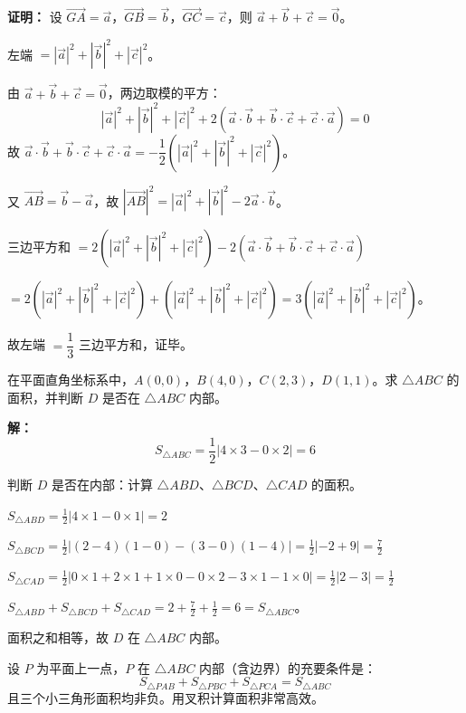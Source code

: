 \documentclass[12pt, a4paper]{ctexart}
\begin{document}
\textbf{证明：} 设 $\overrightarrow{GA}=\vec{a}$，$\overrightarrow{GB}=\vec{b}$，$\overrightarrow{GC}=\vec{c}$，则 $\vec{a}+\vec{b}+\vec{c}=\vec{0}$。

左端 $= |\vec{a}|^2 + |\vec{b}|^2 + |\vec{c}|^2$。

由 $\vec{a}+\vec{b}+\vec{c}=\vec{0}$，两边取模的平方：
\[
|\vec{a}|^2 + |\vec{b}|^2 + |\vec{c}|^2 + 2(\vec{a}\cdot\vec{b}+\vec{b}\cdot\vec{c}+\vec{c}\cdot\vec{a}) = 0
\]
故 $\vec{a}\cdot\vec{b}+\vec{b}\cdot\vec{c}+\vec{c}\cdot\vec{a} = -\dfrac{1}{2}(|\vec{a}|^2+|\vec{b}|^2+|\vec{c}|^2)$。

又 $\overrightarrow{AB}=\vec{b}-\vec{a}$，故 $|\overrightarrow{AB}|^2 = |\vec{a}|^2+|\vec{b}|^2-2\vec{a}\cdot\vec{b}$。

三边平方和 $= 2(|\vec{a}|^2+|\vec{b}|^2+|\vec{c}|^2) - 2(\vec{a}\cdot\vec{b}+\vec{b}\cdot\vec{c}+\vec{c}\cdot\vec{a})$

$= 2(|\vec{a}|^2+|\vec{b}|^2+|\vec{c}|^2) + (|\vec{a}|^2+|\vec{b}|^2+|\vec{c}|^2) = 3(|\vec{a}|^2+|\vec{b}|^2+|\vec{c}|^2)$。

故左端 $= \dfrac{1}{3}$ 三边平方和，证毕。

\begin{examplebox}[【例题12】叉积面积与向量共面]
在平面直角坐标系中，$A(0,0)$，$B(4,0)$，$C(2,3)$，$D(1,1)$。求 $\triangle ABC$ 的面积，并判断 $D$ 是否在 $\triangle ABC$ 内部。
\end{examplebox}

\textbf{解：}
\[
S_{\triangle ABC} = \frac{1}{2}|4 \times 3 - 0 \times 2| = 6
\]

判断 $D$ 是否在内部：计算 $\triangle ABD$、$\triangle BCD$、$\triangle CAD$ 的面积。

$S_{\triangle ABD} = \frac{1}{2}|4 \times 1 - 0 \times 1| = 2$

$S_{\triangle BCD} = \frac{1}{2}|(2-4)(1-0) - (3-0)(1-4)| = \frac{1}{2}|-2+9| = \frac{7}{2}$

$S_{\triangle CAD} = \frac{1}{2}|0 \times 1 + 2 \times 1 + 1 \times 0 - 0 \times 2 - 3 \times 1 - 1 \times 0| = \frac{1}{2}|2-3| = \frac{1}{2}$

$S_{\triangle ABD} + S_{\triangle BCD} + S_{\triangle CAD} = 2 + \frac{7}{2} + \frac{1}{2} = 6 = S_{\triangle ABC}$。

面积之和相等，故 $D$ 在 $\triangle ABC$ 内部。

\begin{tipbox}[判断点在三角形内部的方法]
设 $P$ 为平面上一点，$P$ 在 $\triangle ABC$ 内部（含边界）的充要条件是：
\[
S_{\triangle PAB} + S_{\triangle PBC} + S_{\triangle PCA} = S_{\triangle ABC}
\]
且三个小三角形面积均非负。用叉积计算面积非常高效。
\end{tipbox}
\end{document}
